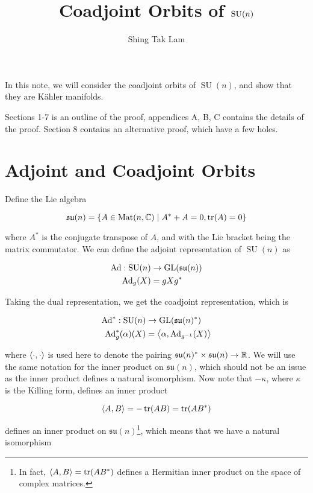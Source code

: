 \documentclass{article}
\title{Coadjoint Orbits of \(\SU(n)\)}
\author{Shing Tak Lam}
\DeclareMathOperator{\SU}{SU}
\newcommand{\su}{\mathfrak{su}}
\begin{document}
\maketitle

In this note, we will consider the coadjoint orbits of \(\SU(n)\), and show that they are K\"ahler manifolds.

Sections 1-7 is an outline of the proof, appendices A, B, C contains the details of the proof. Section 8 contains an alternative proof, which have a few holes.

\tableofcontents

\section{Adjoint and Coadjoint Orbits}

Define the Lie algebra

\[\su(n) = \left\{A \in \Mat(n, \C) \mid A^* + A = 0, \tr(A) = 0\right\}\]

where \(A^*\) is the conjugate transpose of \(A\), and with the Lie bracket being the matrix commutator. We can define the adjoint representation of \(\SU(n)\) as

\begin{align*}
    \Ad : \SU(n) &\to \GL(\su(n)) \\
    \Ad_g(X) &= gXg^*
\end{align*}

Taking the dual representation, we get the coadjoint representation, which is

\begin{align*}
    \Ad^* : \SU(n) &\to \GL(\su(n)^*) \\
    \Ad^*_g(\alpha)(X) &= \inner{\alpha, \Ad_{g^{-1}}(X)}
\end{align*}

where \(\left\langle \cdot, \cdot \right\rangle\) is used here to denote the pairing \(\su(n)^* \times \su(n) \to \R\). We will use the same notation for the inner product on \(\su(n)\), which should not be an issue as the inner product defines a natural isomorphism. Now note that \(-\kappa\), where \(\kappa\) is the Killing form, defines an inner product

\[\left\langle A, B \right\rangle = -\tr(AB) = \tr(AB^*)\]

defines an inner product on \(\su(n)\)\footnote{In fact, \(\left\langle A, B \right\rangle = \tr(AB^*)\) defines a Hermitian inner product on the space of complex matrices.}, which means that we have a natural isomorphism
\end{document}
